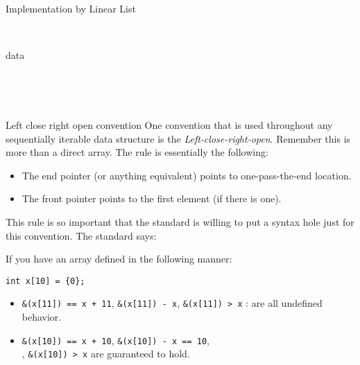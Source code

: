 \begin{frame}{Implementation by Linear List}
\vspace{-.2in}
\begin{bytefield}[leftcurly=., leftcurlyspace=0pt]{36}
	\begin{leftwordgroup}{}
	\end{leftwordgroup}\\
	\begin{leftwordgroup}{data}
	\end{leftwordgroup}\\
	\begin{leftwordgroup}{}

	\end{leftwordgroup}\\
\end{bytefield}
\end{frame}

\begin{frame}[fragile]{Left close right open convention}
One convention that is used throughout any sequentially iterable data structure is the \textit{Left-close-right-open}. Remember this is more than a direct array. The rule is essentially the following:
\begin{itemize}
	\item The end pointer (or anything equivalent) points to one-pass-the-end location.
	\item The front pointer points to the first element (if there is one).
\end{itemize}
This rule is so important that the standard is willing to put a syntax hole just for this convention. The standard says:

\vspace{0.1in}
If you have an array defined in the following manner:
\begin{verbatim}
int x[10] = {0};
\end{verbatim}
\begin{itemize}
	\item \texttt{\&(x[11]) == x + 11}, \texttt{\&(x[11]) - x}, \texttt{\&(x[11]) > x} : are all undefined behavior.
	\item \texttt{\&(x[10]) == x + 10}, \texttt{\&(x[10]) - x == 10},\\, \texttt{\&(x[10]) > x} are guaranteed to hold.
\end{itemize}
\end{frame}

